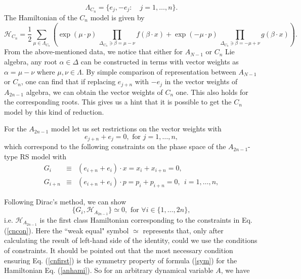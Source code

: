 \documentclass[a4paper,12pt]{article}
\begin{document}
\begin{equation}
\Lambda _{C_{n}}=\{e_{j},-e_{j}:\quad j=1,\ldots ,n\}.
\end{equation}
The Hamiltonian of the $C_{n}$ model is given by
\begin{equation}
\mathcal{H}_{C_{n}}=\frac{1}{2}\sum_{\mu \in \Lambda _{C_{n}}}
\left( \exp \left( \mu \cdot p\right) \,\prod_{\Delta _{C_{n}}
\ni \beta =\mu -\nu}f(\beta \cdot x){+}\exp \left( -\mu \cdot p\right)
\,\prod_{\Delta
_{C_{n}}\ni \beta =-\mu +\nu }g(\beta \cdot x)\right) .	 \label{cnhami}
\end{equation}
From the above-mentioned data, we notice that either for
$A_{N-1}$ or $C_{n}$ Lie algebra, any root $\alpha \in
\Delta $ can be constructed in terms with vector weights as
$\alpha =\mu -\nu $ where $\mu ,\nu \in \Lambda .$ By simple
comparison of representation between $A_{N-1}$ or $C_{n}$,
one can find that if replacing $e_{j+n}$ with $-e_{j}$ in
the vector weights of $A_{2n-1}$ algebra, we can obtain
the vector weights of $C_{n}$ one. This also holds for the
corresponding roots. This gives us a hint that it is
possible to get the $C_{n}$ model by this kind of reduction.

For the $A_{2n-1}$ model let us set restrictions on the vector
weights with
\begin{equation}
e_{j+n}+e_{j}=0,\mbox{\ \ \  for \ \ \ }j=1,\ldots ,n,
\end{equation}
which correspond to the following constraints on the phase
space of the $A_{2n-1}$-type RS model with
\begin{eqnarray}
G_{i} &\equiv &(e_{i+n}+e_{i})\cdot x=x_{i}+x_{i+n}=0,
\nonumber \\ G_{i+n} &\equiv &(e_{i+n}+e_{i})\cdot
p=p_{i}+p_{i+n}=0,\ \ i=1,\ldots ,n,
\label{cncon}
\end{eqnarray}

\noindent Following Dirac's method\cite{Dirac}, we can show
\begin{equation}
\{G_{i},\mathcal{H}_{A_{2n-1}}\}\simeq 0,\mbox{\ \ \ for \ \ \ \ }\forall
i\in \{1,\ldots ,2n\},	\label{cnfirst}
\end{equation}
i.e. $\mathcal{H}_{A_{2n-1}}$ is the first class Hamiltonian
corresponding to the constraints in Eq. (\ref{cncon}). Here
the ``weak equal" symbol $\simeq $ represents that, only after calculating
the result of left-hand side of the identity, could we use
the conditions of constraints. It should be pointed out that
the most necessary condition ensuring Eq. (\ref{cnfirst}) is
the symmetry property of formula (\ref{sym}) for the
Hamiltonian Eq. (\ref {anhami}). So for an arbitrary
dynamical variable $A$, we have
\end{document}
